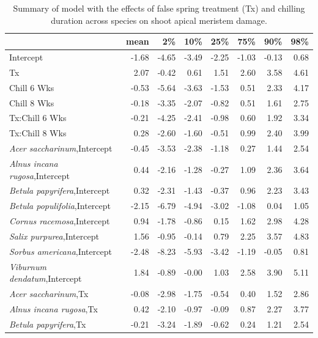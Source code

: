 \documentclass{article}\usepackage[]{graphicx}\usepackage[]{color}
\begin{document}
\newpage
\begin{longtable}{lrrrrrrr}
\caption{Summary of model with the effects of false spring treatment (Tx) and chilling duration across species on shoot apical meristem damage.} \\ 
  \hline
 & mean & 2\% & 10\% & 25\% & 75\% & 90\% & 98\% \\ 
  \hline \endhead  \hline
Intercept & -1.68 & -4.65 & -3.49 & -2.25 & -1.03 & -0.13 & 0.68 \\ 
  Tx & 2.07 & -0.42 & 0.61 & 1.51 & 2.60 & 3.58 & 4.61 \\ 
  Chill 6 Wks & -0.53 & -5.64 & -3.63 & -1.53 & 0.51 & 2.33 & 4.17 \\ 
  Chill 8 Wks & -0.18 & -3.35 & -2.07 & -0.82 & 0.51 & 1.61 & 2.75 \\ 
  Tx:Chill 6 Wks & -0.21 & -4.25 & -2.41 & -0.98 & 0.60 & 1.92 & 3.34 \\ 
  Tx:Chill 8 Wks & 0.28 & -2.60 & -1.60 & -0.51 & 0.99 & 2.40 & 3.99 \\ 
  \textit{Acer saccharinum},Intercept & -0.45 & -3.53 & -2.38 & -1.18 & 0.27 & 1.44 & 2.54 \\ 
  \textit{Alnus incana rugosa},Intercept & 0.44 & -2.16 & -1.28 & -0.27 & 1.09 & 2.36 & 3.64 \\ 
  \textit{Betula papyrifera},Intercept & 0.32 & -2.31 & -1.43 & -0.37 & 0.96 & 2.23 & 3.43 \\ 
  \textit{Betula populifolia},Intercept & -2.15 & -6.79 & -4.94 & -3.02 & -1.08 & 0.04 & 1.05 \\ 
  \textit{Cornus racemosa},Intercept & 0.94 & -1.78 & -0.86 & 0.15 & 1.62 & 2.98 & 4.28 \\ 
  \textit{Salix purpurea},Intercept & 1.56 & -0.95 & -0.14 & 0.79 & 2.25 & 3.57 & 4.83 \\ 
  \textit{Sorbus americana},Intercept & -2.48 & -8.23 & -5.93 & -3.42 & -1.19 & -0.05 & 0.81 \\ 
  \textit{Viburnum dendatum},Intercept & 1.84 & -0.89 & -0.00 & 1.03 & 2.58 & 3.90 & 5.11 \\ 
  \textit{Acer saccharinum},Tx & -0.08 & -2.98 & -1.75 & -0.54 & 0.40 & 1.52 & 2.86 \\ 
  \textit{Alnus incana rugosa},Tx & 0.42 & -2.10 & -0.97 & -0.09 & 0.87 & 2.27 & 3.77 \\ 
  \textit{Betula papyrifera},Tx & -0.21 & -3.24 & -1.89 & -0.62 & 0.24 & 1.21 & 2.54 \\ 

\end{longtable}
\end{document}
